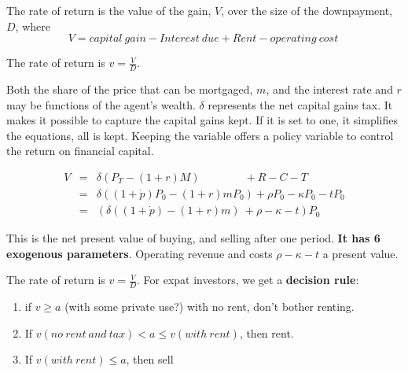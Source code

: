 The rate of return is the value of the gain, $V$,  over the size of the downpayment, $D$, where
\begin{equation}
V =capital\ gain - Interest\ due  	+ Rent  - operating\ cost\    
\end{equation}

The rate of return is $v = \frac{V}{D}$. 

Both the  share of the price  that can be mortgaged, $m$, and the interest rate  and $r$ may be functions of the agent's wealth. $\delta$ represents the net capital gains tax. It makes it possible to capture the capital gains kept. If it is set to one, it simplifies the equations, all is kept. Keeping the variable offers a policy variable to control the return on financial capital.

\begin{eqnarray*}
V  %
&=& \delta(P_T- (1+r)M) \qquad \qquad 	 + R  	-C   - T\\
&=& \delta((1+\dot p)  P_0- (1+r)mP_0)   + \rho P_0  	-\kappa P_0 - tP_0\\
&=&( \delta((1+\dot p)  - (1+r)m) \ + \rho   	-\kappa -t) P_0
\end{eqnarray*}

This is the  net present value of buying, and selling after one period. \textbf{It has  6 exogenous parameters}. Operating revenue and costs $ \rho -\kappa - t$ a present value. 

The rate of return is $v = \frac{V}{D}$. For expat investors, we get a \textbf{decision rule}:\begin{enumerate}
\item  if $v \geq a$ (with some private use?) with no rent,  don't bother renting. 
\item If $v(no\ rent\ and\ tax) < a\leq v(with\ rent)$,  then  rent. 
\item If $ v(with\ rent) \le a $,  then sell 
\end{enumerate}


